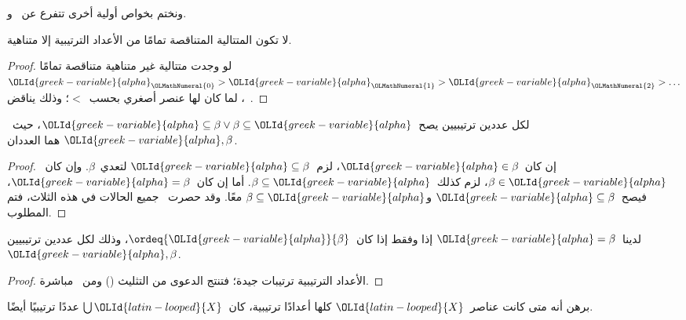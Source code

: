 \documentclass[../../../include/open-logic-section]{subfiles}
\begin{document}
ونختم بخواص أولية أخرى تتفرع عن~
و.

\begin{prop}
لا تكون المتتالية المتناقصة تمامًا من الأعداد الترتيبية إلا متناهية.
\end{prop}

\begin{proof}
لو وجدت متتالية غير متناهية متناقصة تمامًا
${\OLId{greek-variable}{alpha}}_{\OLMathNumeral{0}} > {\OLId{greek-variable}{alpha}}_{\OLMathNumeral{1}} > {\OLId{greek-variable}{alpha}}_{\OLMathNumeral{2}} > \ldots$، لما كان لها عنصر أصغري
بحسب~$<$؛ وذلك يناقض~.
\end{proof}

\begin{prop}
لكل عددين ترتيبيين يصح~${\OLId{greek-variable}{alpha}} \subseteq \beta \lor \beta \subseteq {\OLId{greek-variable}{alpha}}$،
حيث~${\OLId{greek-variable}{alpha}}, \beta$ هما العددان.
\end{prop}

\begin{proof}
إن كان~${\OLId{greek-variable}{alpha}} \in \beta$، لزم~${\OLId{greek-variable}{alpha}} \subseteq \beta$ لتعدي~$\beta$.
وإن كان~$\beta \in {\OLId{greek-variable}{alpha}}$، لزم كذلك~$\beta \subseteq {\OLId{greek-variable}{alpha}}$.
أما إن كان~${\OLId{greek-variable}{alpha}} = \beta$، فيصح~${\OLId{greek-variable}{alpha}} \subseteq \beta$
و$\beta \subseteq {\OLId{greek-variable}{alpha}}$ معًا. وقد حصرت~
جميع الحالات في هذه الثلاث، فتم المطلوب.
\end{proof}

\begin{prop}
لدينا~${\OLId{greek-variable}{alpha}} = \beta$ إذا وفقط إذا كان~$\ordeq{{\OLId{greek-variable}{alpha}}}{\beta}$،
وذلك لكل عددين ترتيبيين~${\OLId{greek-variable}{alpha}}, \beta$.
\end{prop}

\begin{proof}
الأعداد الترتيبية ترتيبات جيدة؛ فتنتج الدعوى من التثليث
() ومن~ مباشرة.
\end{proof}

\begin{prob}
برهن أنه متى كانت عناصر~${\OLId{latin-looped}{X}}$ كلها أعدادًا ترتيبية، كان~$\bigcup {\OLId{latin-looped}{X}}$
عددًا ترتيبيًا أيضًا.
\end{prob}
\end{document}

